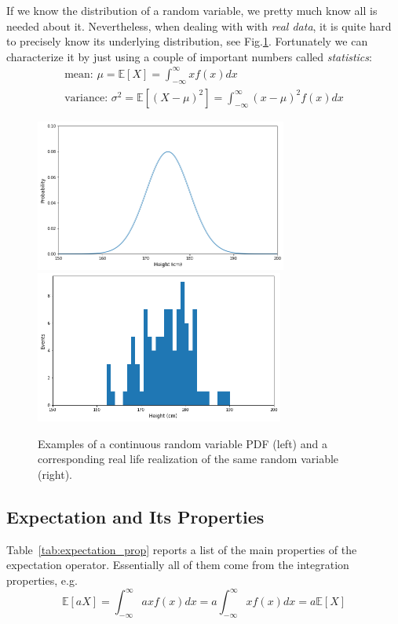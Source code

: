 \documentclass[12pt,a4paper]{book}
\begin{document}
If we know the distribution of a random variable, we pretty much know all is needed about it. 	
Nevertheless, when dealing with with \textit{real data}, it is quite hard to precisely know its underlying distribution, see Fig.\ref{fig:real_data}. Fortunately we can characterize it by just using a couple of important numbers called \emph{statistics}:
\begin{equation}
\begin{gathered}
\text{mean: } \mu = \mathbb{E}[X] = \int_{-\infty}^{\infty} xf(x)dx \\
\text{variance: }  
\sigma^2 = \mathbb{E}[(X-\mu)^2] =\int_{-\infty}^{\infty} (x-\mu)^2f(x)dx
\end{gathered}
\end{equation}

\begin{figure}[htbp]
\begin{center}
\includegraphics[height=5cm]{continouos_random_variable}
\includegraphics[height=5cm]{real_data}
\caption{Examples of a continuous random variable PDF (left) and a corresponding real life realization of the same random variable (right).}
\label{fig:real_data}
\end{center}
\end{figure} 

\subsection{Expectation and Its Properties}
Table~\ref{tab:expectation_prop} reports a list of the main properties of the expectation operator.
Essentially all of them come from the integration properties, e.g.
\begin{equation*}
	\mathbb{E}[aX] = \int_{-\infty}^{\infty} ax f(x) dx = a  \int_{-\infty}^{\infty} x f(x) dx = a\mathbb{E}[X]
\end{equation*}
\end{document}
